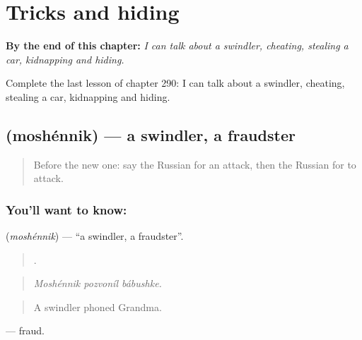 
\chapter{Tricks and hiding}
\label{ch:ru-tricks-and-hiding}

\begin{chapteropening}
\textbf{By the end of this chapter:} \emph{I can talk about a swindler, cheating, stealing a car, kidnapping and hiding.}

Complete the last lesson of chapter 290: I can talk about a swindler, cheating, stealing a car, kidnapping and hiding.
\end{chapteropening}

\section[\texorpdfstring{\ru{мошенник} (moshénnik)}{мошенник (moshénnik)}]{ (moshénnik) — a swindler, a fraudster}

\label{lesson:RU-C290-moshennik}



\begin{quote}
Before the new one: say the Russian for an attack, then the Russian for to attack.
\end{quote}

\subsection*{You'll want to know: }
\textbf{} (\emph{moshénnik}) — \textquotedblleft{}a swindler, a fraudster\textquotedblright{}.

\begin{quote}
  .
\end{quote}

\begin{quote}
\emph{Moshénnik pozvoníl bábushke.}
\end{quote}

\begin{quote}
A swindler phoned Grandma.
\end{quote}

\emph{} — fraud.

